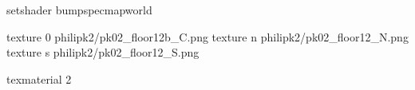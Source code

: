 setshader bumpspecmapworld

texture 0 philipk2/pk02_floor12b_C.png
texture n philipk2/pk02_floor12_N.png
texture s philipk2/pk02_floor12_S.png

texmaterial 2
